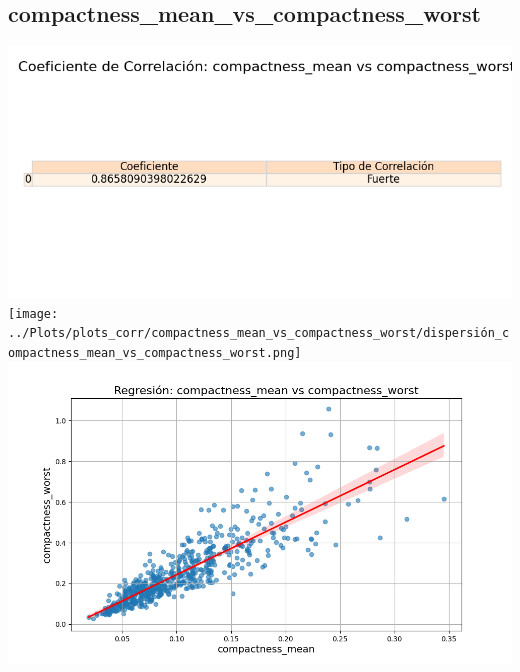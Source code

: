\documentclass[a4paper, 12pt]{article}
\begin{document}
\subsection{compactness\_mean\_vs\_compactness\_worst}
    \includegraphics[width = \textwidth]{../Plots/plots_corr/compactness_mean_vs_compactness_worst/coeficiente_correlacion_compactness_mean_vs_compactness_worst.png}
    \texttt{[image: ../Plots/plots\_corr/compactness\_mean\_vs\_compactness\_worst/dispersión\_compactness\_mean\_vs\_compactness\_worst.png]}
    \includegraphics[width = \textwidth]{../Plots/plots_corr/compactness_mean_vs_compactness_worst/regresion_compactness_mean_vs_compactness_worst.png}
\end{document}
